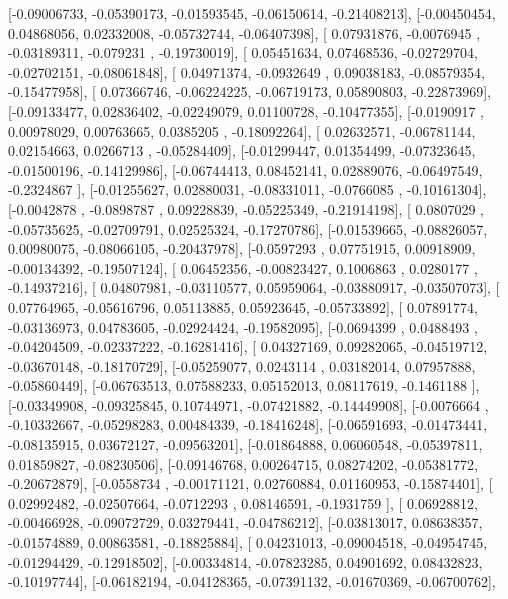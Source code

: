 \documentclass{article}
\begin{document}
       [-0.09006733, -0.05390173, -0.01593545, -0.06150614, -0.21408213],
       [-0.00450454,  0.04868056,  0.02332008, -0.05732744, -0.06407398],
       [ 0.07931876, -0.0076945 , -0.03189311, -0.079231  , -0.19730019],
       [ 0.05451634,  0.07468536, -0.02729704, -0.02702151, -0.08061848],
       [ 0.04971374, -0.0932649 ,  0.09038183, -0.08579354, -0.15477958],
       [ 0.07366746, -0.06224225, -0.06719173,  0.05890803, -0.22873969],
       [-0.09133477,  0.02836402, -0.02249079,  0.01100728, -0.10477355],
       [-0.0190917 ,  0.00978029,  0.00763665,  0.0385205 , -0.18092264],
       [ 0.02632571, -0.06781144,  0.02154663,  0.0266713 , -0.05284409],
       [-0.01299447,  0.01354499, -0.07323645, -0.01500196, -0.14129986],
       [-0.06744413,  0.08452141,  0.02889076, -0.06497549, -0.2324867 ],
       [-0.01255627,  0.02880031, -0.08331011, -0.0766085 , -0.10161304],
       [-0.0042878 , -0.0898787 ,  0.09228839, -0.05225349, -0.21914198],
       [ 0.0807029 , -0.05735625, -0.02709791,  0.02525324, -0.17270786],
       [-0.01539665, -0.08826057,  0.00980075, -0.08066105, -0.20437978],
       [-0.0597293 ,  0.07751915,  0.00918909, -0.00134392, -0.19507124],
       [ 0.06452356, -0.00823427,  0.1006863 ,  0.0280177 , -0.14937216],
       [ 0.04807981, -0.03110577,  0.05959064, -0.03880917, -0.03507073],
       [ 0.07764965, -0.05616796,  0.05113885,  0.05923645, -0.05733892],
       [ 0.07891774, -0.03136973,  0.04783605, -0.02924424, -0.19582095],
       [-0.0694399 ,  0.0488493 , -0.04204509, -0.02337222, -0.16281416],
       [ 0.04327169,  0.09282065, -0.04519712, -0.03670148, -0.18170729],
       [-0.05259077,  0.0243114 ,  0.03182014,  0.07957888, -0.05860449],
       [-0.06763513,  0.07588233,  0.05152013,  0.08117619, -0.1461188 ],
       [-0.03349908, -0.09325845,  0.10744971, -0.07421882, -0.14449908],
       [-0.0076664 , -0.10332667, -0.05298283,  0.00484339, -0.18416248],
       [-0.06591693, -0.01473441, -0.08135915,  0.03672127, -0.09563201],
       [-0.01864888,  0.06060548, -0.05397811,  0.01859827, -0.08230506],
       [-0.09146768,  0.00264715,  0.08274202, -0.05381772, -0.20672879],
       [-0.0558734 , -0.00171121,  0.02760884,  0.01160953, -0.15874401],
       [ 0.02992482, -0.02507664, -0.0712293 ,  0.08146591, -0.1931759 ],
       [ 0.06928812, -0.00466928, -0.09072729,  0.03279441, -0.04786212],
       [-0.03813017,  0.08638357, -0.01574889,  0.00863581, -0.18825884],
       [ 0.04231013, -0.09004518, -0.04954745, -0.01294429, -0.12918502],
       [-0.00334814, -0.07823285,  0.04901692,  0.08432823, -0.10197744],
       [-0.06182194, -0.04128365, -0.07391132, -0.01670369, -0.06700762],
\end{document}
